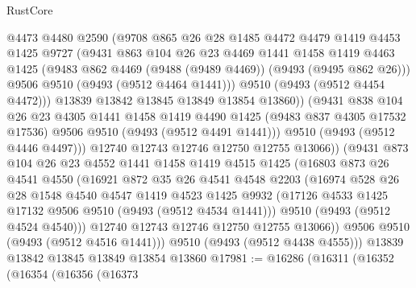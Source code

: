 \begin{lexlean}{RustCore}
\begin{coremodule}
                @4473
                @4480
                @2590
                (@9708
                  @865
                  @26
                  @28
                  @1485
                  @4472
                  @4479
                  @1419
                  @4453
                  @1425
                  @9727
                  (@9431
                    @863
                    @104
                    @26
                    @23
                    @4469
                    @1441
                    @1458
                    @1419
                    @4463
                    @1425
                    (@9483 @862 @4469 (@9488 (@9489 @4469)) (@9493 (@9495 @862 @26)))
                    @9506
                    @9510
                    (@9493 (@9512 @4464 @1441)))
                  @9510
                  (@9493 (@9512 @4454 @4472)))
                @13839
                @13842
                @13845
                @13849
                @13854
                @13860))
            (@9431
              @838
              @104
              @26
              @23
              @4305
              @1441
              @1458
              @1419
              @4490
              @1425
              (@9483 @837 @4305 @17532 @17536)
              @9506
              @9510
              (@9493 (@9512 @4491 @1441)))
            @9510
            (@9493 (@9512 @4446 @4497)))
          @12740
          @12743
          @12746
          @12750
          @12755
          @13066))
      (@9431
        @873
        @104
        @26
        @23
        @4552
        @1441
        @1458
        @1419
        @4515
        @1425
        (@16803
          @873
          @26
          @4541
          @4550
          (@16921
            @872
            @35
            @26
            @4541
            @4548
            @2203
            (@16974
              @528
              @26
              @28
              @1548
              @4540
              @4547
              @1419
              @4523
              @1425
              @9932
              (@17126 @4533 @1425 @17132 @9506 @9510 (@9493 (@9512 @4534 @1441)))
              @9510
              (@9493 (@9512 @4524 @4540)))
            @12740
            @12743
            @12746
            @12750
            @12755
            @13066))
        @9506
        @9510
        (@9493 (@9512 @4516 @1441)))
      @9510
      (@9493 (@9512 @4438 @4555)))
    @13839
    @13842
    @13845
    @13849
    @13854
    @13860
@17981 := @16286
    (@16311
      (@16352
        (@16354
          (@16356
            (@16373

\end{coremodule}
\end{lexlean}
